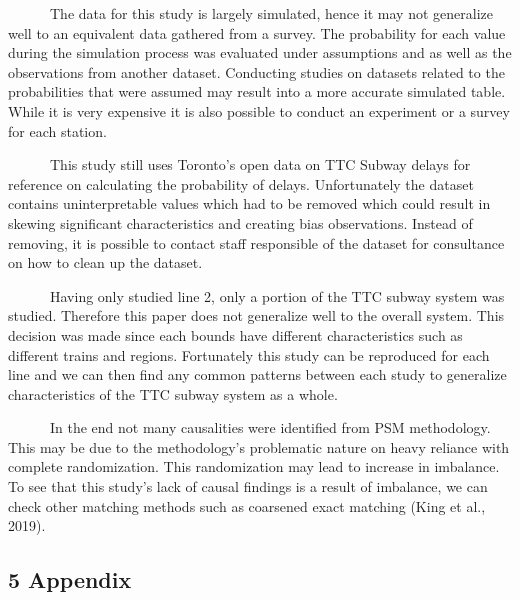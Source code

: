 \documentclass[
]{article}
\begin{document}
~~~~~~The data for this study is largely simulated, hence it may not
generalize well to an equivalent data gathered from a survey. The
probability for each value during the simulation process was evaluated
under assumptions and as well as the observations from another dataset.
Conducting studies on datasets related to the probabilities that were
assumed may result into a more accurate simulated table. While it is
very expensive it is also possible to conduct an experiment or a survey
for each station.

~~~~~~This study still uses Toronto's open data on TTC Subway delays for
reference on calculating the probability of delays. Unfortunately the
dataset contains uninterpretable values which had to be removed which
could result in skewing significant characteristics and creating bias
observations. Instead of removing, it is possible to contact staff
responsible of the dataset for consultance on how to clean up the
dataset.

~~~~~~Having only studied line 2, only a portion of the TTC subway
system was studied. Therefore this paper does not generalize well to the
overall system. This decision was made since each bounds have different
characteristics such as different trains and regions. Fortunately this
study can be reproduced for each line and we can then find any common
patterns between each study to generalize characteristics of the TTC
subway system as a whole.

~~~~~~In the end not many causalities were identified from PSM
methodology. This may be due to the methodology's problematic nature on
heavy reliance with complete randomization. This randomization may lead
to increase in imbalance. To see that this study's lack of causal
findings is a result of imbalance, we can check other matching methods
such as coarsened exact matching (King et al., 2019).

\hypertarget{appendix}{%
\subsection{5 Appendix}\label{appendix}}
\end{document}
